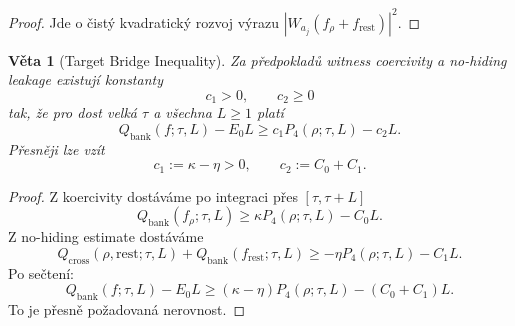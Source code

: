 \documentclass[11pt,a4paper]{article}
\newtheorem{theorem}{Věta}[section]
\begin{document}
\begin{proof}
Jde o čistý kvadratický rozvoj výrazu \(|W_{a_j}(f_\rho+f_{\mathrm{rest}})|^2\).
\end{proof}

\begin{theorem}[Target Bridge Inequality]
Za předpokladů witness coercivity a no-hiding leakage existují konstanty
\[
c_1>0,\qquad c_2\ge 0
\]
tak, že pro dost velká \(\tau\) a všechna \(L\ge 1\) platí
\[
Q_{\mathrm{bank}}(f;\tau,L)-E_0L
\ge
c_1P_4(\rho;\tau,L)-c_2L.
\]
Přesněji lze vzít
\[
c_1:=\kappa-\eta>0,
\qquad
c_2:=C_0+C_1.
\]
\end{theorem}

\begin{proof}
Z koercivity dostáváme po integraci přes \([\tau,\tau+L]\)
\[
Q_{\mathrm{bank}}(f_\rho;\tau,L)\ge \kappa P_4(\rho;\tau,L)-C_0L.
\]
Z no-hiding estimate dostáváme
\[
Q_{\mathrm{cross}}(\rho,\mathrm{rest};\tau,L)
+
Q_{\mathrm{bank}}(f_{\mathrm{rest}};\tau,L)
\ge
-\eta P_4(\rho;\tau,L)-C_1L.
\]
Po sečtení:
\[
Q_{\mathrm{bank}}(f;\tau,L)-E_0L
\ge
(\kappa-\eta)P_4(\rho;\tau,L)-(C_0+C_1)L.
\]
To je přesně požadovaná nerovnost.
\end{proof}
\end{document}
